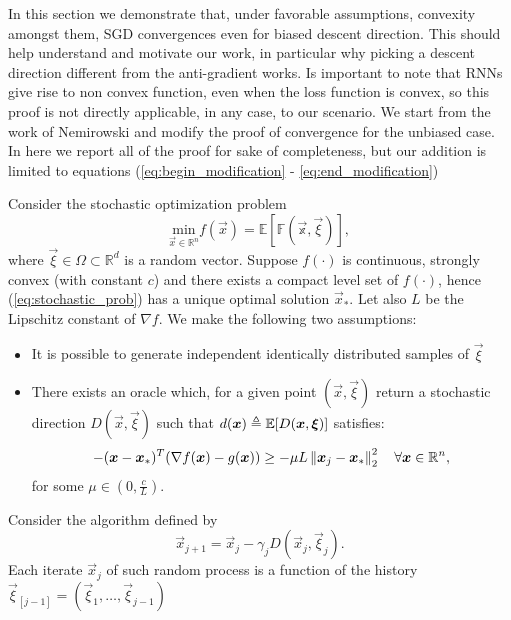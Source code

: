 In this section we demonstrate that, under favorable assumptions, convexity amongst them, SGD convergences even for biased descent direction. This should help understand and motivate our work, in particular why picking a descent direction different from the anti-gradient works. Is important to note that RNNs give rise to non convex function, even when the loss function is convex, so this proof is not directly applicable, in any case, to our scenario.  We start from the work of Nemirowski \cite{Nemirovski} and modify the proof of convergence for the unbiased case. In here we report all of the proof for sake of completeness, but our addition is limited to equations (\ref{eq:begin_modification} - \ref{eq:end_modification})


Consider the stochastic optimization problem 
\begin{equation}
\underset{\vec{x} \in \mathbb{R}^n}{\text{min}} f(\vec{x}) = \mathbb{E[F(\vec{x}, \vec{\xi})]},
\label{eq:stochastic_prob}
\end{equation}
where $\vec{\xi} \in \Omega \subset \mathbb{R}^d$ is a random vector.
Suppose $f(\cdot)$ is continuous, strongly convex (with constant $c$) and there exists a compact level set of $f(\cdot)$, hence (\ref{eq:stochastic_prob}) has a unique optimal solution $\vec{x}_*$. Let also $L$ be the Lipschitz constant of $\nabla f$.
We make the following two assumptions:
\begin{itemize}
	\item	It is possible to generate independent identically distributed samples of $\vec{\xi}$
	\item There exists an oracle which, for a given point $(\vec{x}, \vec{\xi})$ return a stochastic direction $D(\vec{x}, \vec{\xi})$ such that $d(\boldsymbol{x})\triangleq\mathbb{E}[D(\boldsymbol{x}, \boldsymbol{\xi})]$ satisfies:
	\begin{equation}
	-(\boldsymbol{x}-\boldsymbol{x}_*)^T (\nabla f(\boldsymbol{x}) -g(\boldsymbol{x})) \geq -\mu L \left\Vert \boldsymbol{x}_j-\boldsymbol{x}_* \right\Vert^2_2\quad \forall \boldsymbol{x} \in \mathbb{R}^n,
	\label{eq:angular_condition}
	\end{equation}
	for some $\mu \in (0,\frac{c}{L}) $.
\end{itemize}
Consider the algorithm defined by
\begin{equation}
\vec{x}_{j+1} = \vec{x}_j -\gamma_j D(\vec{x}_j,\vec{\xi}_j).
\label{eq:stochastic_algo}
\end{equation}
Each iterate $\vec{x}_j$ of such random process is a function of the history $\vec{\xi}_{[j-1]}=(\vec{\xi}_1,\dots, \vec{\xi}_{j-1})$

